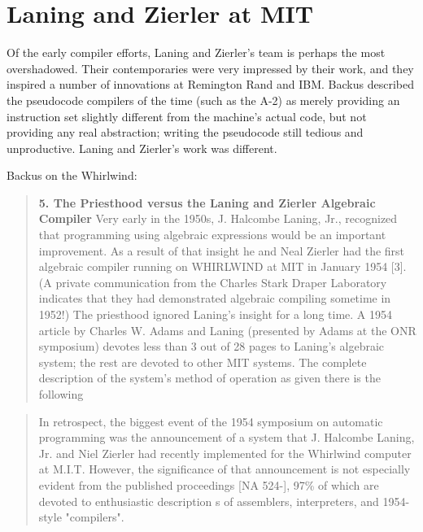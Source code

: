

\section{Laning and Zierler at MIT}
\label{sec:laning-zierler}

Of the early compiler efforts, Laning and Zierler's team is perhaps the most overshadowed.
Their contemporaries were very impressed by their work, and they inspired a number
of innovations at Remington Rand and IBM.
Backus described the pseudocode compilers of the time (such as the A-2)
as merely providing an instruction set
slightly different from the machine's actual code, but not providing any real abstraction;
writing the pseudocode still tedious and unproductive.
Laning and Zierler's work was different.


Backus on the Whirlwind\cite{Backus_1980_Programming_in_America_in_1950s}:
\begin{quotation}
  \textbf{5. The Priesthood versus the Laning and Zierler Algebraic Compiler}
  Very early in the 1950s, J. Halcombe Laning, Jr., recognized that
  programming using algebraic expressions would be an important improvement.
  As a result of that insight he and Neal Zierler had the first
  algebraic compiler
  running on WHIRLWIND at MIT in January 1954 [3]. (A private
    communication from the Charles Stark Draper Laboratory indicates
    that they had
  demonstrated algebraic compiling sometime in 1952!) The priesthood
  ignored Laning's insight for a long time. A 1954 article by Charles W. Adams
  and Laning (presented by Adams at the ONR symposium) devotes less than
  3 out of 28 pages to Laning's algebraic system; the rest are devoted to other
  MIT systems. The complete description of the system's method of operation
  as given there is the following
\end{quotation}

\begin{quotation}
  In retrospect, the biggest event of the 1954 symposium on automatic
  programming
  was the announcement of a system that J. Halcombe Laning, Jr. and Niel Zierler
  had recently implemented for the Whirlwind computer at M.I.T.  However, the
  significance of that announcement is not especially evident from the published
  proceedings [NA 524-], 97\% of which are devoted to enthusiastic description s
  of assemblers, interpreters, and 1954-style "compilers".
  \cite{Knuth_TrabbPardo_1976_Early_Development}
\end{quotation}

